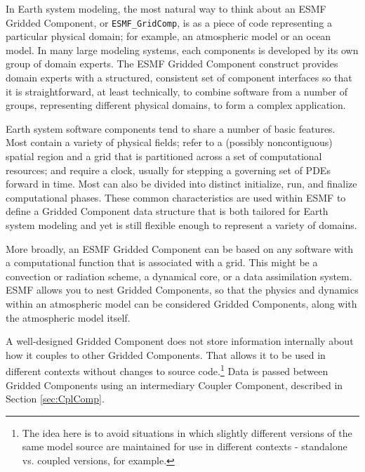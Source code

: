 %


In Earth system modeling, the most natural way to think about an ESMF 
Gridded Component, or {\tt ESMF_GridComp}, is as a piece of code 
representing a particular physical domain; for example, an atmospheric 
model or an ocean model.  
In many large modeling systems, each components is developed by its
own group of domain experts.  The ESMF Gridded Component construct 
provides domain experts with a structured, consistent set of component 
interfaces so that it is straightforward, at least technically, to 
combine software from a number of groups, representing different physical 
domains, to form a complex application.  

Earth system software components tend to share a number of basic 
features.  Most contain a variety of physical fields; refer to 
a (possibly noncontiguous) spatial region and a grid that is 
partitioned across a set of computational resources; and require 
a clock, usually for stepping a governing set of PDEs forward in time.  
Most can also be divided into distinct initialize, run, and finalize 
computational phases.  These common characteristics are used 
within ESMF to define a Gridded Component data structure that 
is both tailored for Earth system modeling and yet is still flexible
enough to represent a variety of domains.

More broadly, an ESMF Gridded Component can be based on any 
software with a computational function that is associated with 
a grid.  This might be a convection or radiation scheme, a 
dynamical core, or a data assimilation system.  ESMF allows you
to nest Gridded Components, so that the physics and dynamics within 
an atmospheric model can be considered Gridded Components, along
with the atmospheric model itself.

A well-designed Gridded Component does not store information 
internally about how it couples to other Gridded Components.  That
allows it to be used in different contexts without changes to source
code.\footnote{The idea here is to avoid situations in which slightly
different versions of the same model source are maintained for use in 
different contexts - standalone vs. coupled versions, for example.}
Data is passed between Gridded Components using an intermediary 
Coupler Component, described in Section \ref{sec:CplComp}.


